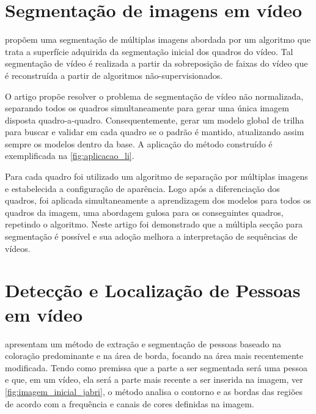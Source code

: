 \documentclass[12pt,oneside,a4paper,chapter=TITLE,section=TITLE,sumario=tradicional]{abntex2}
\begin{document}
\section{Segmentação de imagens em vídeo}

 propõem uma segmentação de múltiplas imagens abordada por um algoritmo que trata a superfície adquirida da segmentação inicial dos quadros do vídeo. Tal segmentação de vídeo é realizada a partir da sobreposição de faixas do vídeo que é reconstruída a partir de algoritmos não-supervisionados.

O artigo propõe resolver o problema de segmentação de vídeo não normalizada, separando todos os quadros simultaneamente para gerar uma única imagem disposta quadro-a-quadro. Consequentemente, gerar um modelo global de trilha para buscar e validar em cada quadro se o padrão é mantido, atualizando assim sempre os modelos dentro da base. A aplicação do método construído é exemplificada na \autoref{fig:aplicacao_li}.

\begin{figure}[htb]
\end{figure}

Para cada quadro foi utilizado um algoritmo de separação por múltiplas imagens e estabelecida a configuração de aparência. Logo após a diferenciação dos quadros, foi aplicada simultaneamente a aprendizagem dos modelos para todos os quadros da imagem, uma abordagem gulosa para os conseguintes quadros, repetindo o algoritmo. Neste artigo foi demonstrado que a múltipla secção para segmentação é possível e sua adoção melhora a interpretação de sequências de vídeos.

\section{Detecção e Localização de Pessoas em vídeo}

 apresentam um método de extração e segmentação de pessoas baseado na coloração predominante e na área de borda, focando na área mais recentemente modificada. Tendo como premissa que a parte a ser segmentada será uma pessoa e que, em um vídeo, ela será a parte mais recente a ser inserida na imagem, ver \autoref{fig:imagem_inicial_jabri}, o método analisa o contorno e as bordas das regiões de acordo com a frequência e canais de cores definidas na imagem.
\end{document}
